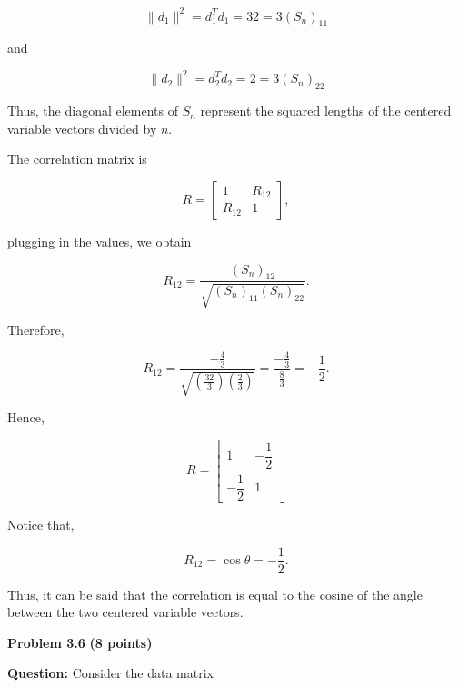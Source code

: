 \documentclass{article}
\begin{document}
$$
\boxed{
\|d_1\|^2=d_1^Td_1=32=3(S_n)_{11}
}
$$

and

$$
\boxed{
\|d_2\|^2=d_2^Td_2=2=3(S_n)_{22}
}
$$

Thus, the diagonal elements of $S_n$ represent the squared lengths
of the centered variable vectors divided by $n$.

The correlation matrix is

$$
R=
\begin{bmatrix}
1&R_{12}\\
R_{12}&1
\end{bmatrix},
$$

plugging in the values, we obtain

$$
R_{12}
=
\frac{(S_n)_{12}}
{\sqrt{(S_n)_{11}(S_n)_{22}}}.
$$

Therefore,

$$
R_{12}
=
\frac{-\frac{4}{3}}
{\sqrt{
\left(\frac{32}{3}\right)
\left(\frac{2}{3}\right)
}}
=
\frac{-\frac{4}{3}}{\frac{8}{3}}
=
-\frac{1}{2}.
$$

Hence,

$$
\boxed{
R=
\begin{bmatrix}
1&-\dfrac12\\
-\dfrac12&1
\end{bmatrix}}
$$

Notice that,

$$
\boxed{R_{12}=\cos\theta=-\frac12}.
$$

Thus, it can be said that the correlation is equal to the cosine of
the angle between the two centered variable vectors.

\vspace{0.3cm}

\begin{center}
\end{center}


\newpage

\noindent
{\Large \textbf{Problem 3.6}}
\hfill
{\large \textbf{(8 points)}}

\vspace{0.3cm}

\noindent
\textbf{Question:} Consider the data matrix
\end{document}
